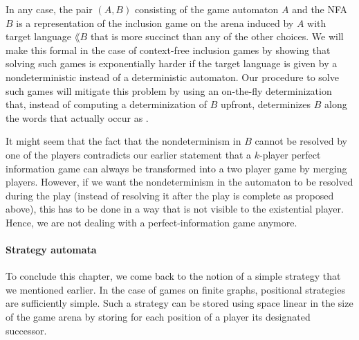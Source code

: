 \documentclass[../../diss.tex]{subfiles}
\begin{document}
In any case, the pair $(A,B)$ consisting of the game automaton $A$ and the NFA $B$ is a representation of the inclusion game on the arena induced by $A$ with target language $\lang{B}$ that is more succinct than any of the other choices.
We will make this formal in the case of context-free inclusion games by showing that solving such games is exponentially harder if the target language is given by a nondeterministic instead of a deterministic automaton.
Our procedure to solve such games will mitigate this problem by using an on-the-fly determinization that, instead of computing a determinization of $B$ upfront, determinizes $B$ along the words that actually occur as .

It might seem that the fact that the nondeterminism in $B$ cannot be resolved by one of the players contradicts our earlier statement that a $k$-player perfect information game can always be transformed into a two player game by merging players.
However, if we want the nondeterminism in the automaton to be resolved during the play (instead of resolving it after the play is complete as proposed above), this has to be done in a way that is not visible to the existential player.
Hence, we are not dealing with a perfect-information game anymore.


\paragraph{Strategy automata}

To conclude this chapter, we come back to the notion of a simple strategy that we mentioned earlier.
In the case of games on finite graphs, positional strategies are sufficiently simple.
Such a strategy can be stored using space linear in the size of the game arena by storing for each position of a player its designated successor.
\end{document}
